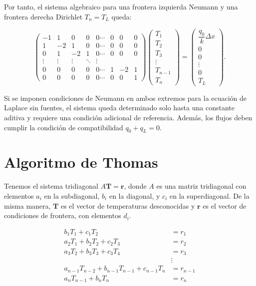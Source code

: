 \documentclass[11pt,a4paper]{article}
\begin{document}
Por tanto, el sistema algebraico para una frontera izquierda Neumann y una
frontera derecha Dirichlet $T_n=T_L$ queda:

\begin{equation}
\begin{pmatrix}
-1 & 1 & 0 & 0 & 0  \cdots & 0 & 0 & 0 \\
1 & -2 & 1 & 0 & 0  \cdots & 0 & 0 & 0 \\
0 & 1 & -2 & 1 & 0  \cdots & 0 & 0 & 0 \\
\vdots & \vdots & \vdots & \ddots & \vdots \\
0 & 0 & 0 & 0 & 0  \cdots & 1 & -2 & 1 \\
0 & 0 & 0 & 0 & 0  \cdots & 0 & 0 & 1
\end{pmatrix}
\begin{pmatrix}
T_1 \\
T_2 \\
T_3 \\
\vdots \\
T_{n-1} \\
T_n
\end{pmatrix}
=
\begin{pmatrix}
\dfrac{q_0}{k} \Delta x \\
0 \\
0 \\
\vdots \\
0 \\
T_L
\end{pmatrix}.
\end{equation}

Si se imponen condiciones de Neumann en ambos extremos para la ecuaci\'on de
Laplace sin fuentes, el sistema queda determinado solo hasta una constante
aditiva y requiere una condici\'on adicional de referencia. Adem\'as, los flujos
deben cumplir la condici\'on de compatibilidad $q_0+q_L=0$.

\section{Algoritmo de Thomas}

Tenemos el sistema tridiagonal $A \mathbf{T} = \mathbf{r}$, donde $A$ es 
una matriz tridiagonal con elementos $a_i$ en la subdiagonal, $b_i$ en la diagonal,
y $c_i$ en la superdiagonal. De la misma manera, $\mathbf{T}$ es el vector de 
temperaturas desconocidas y $\mathbf{r}$ es el vector de condiciones de frontera,
con elementos $d_i$.

\begin{align*}
b_1 T_1 + c_1 T_2 &= r_1 \\
a_2 T_1 + b_2 T_2 + c_2 T_3 &= r_2 \\
a_3 T_2 + b_3 T_3 + c_3 T_4 &= r_3 \\
&\vdots \\
a_{n-1} T_{n-2} + b_{n-1} T_{n-1} + c_{n-1} T_n &= r_{n-1} \\
a_n T_{n-1} + b_n T_n &= r_n
\end{align*}
\end{document}
